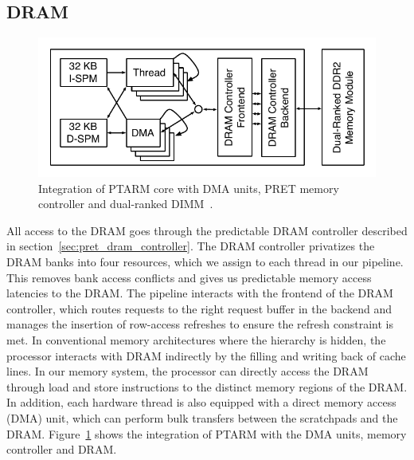 \subsection{DRAM}
\label{sec:ptarm_dram_integration}
\begin{figure}
  \vspace{-20pt}
  \begin{center}
  	\includegraphics[scale=.6]{figs/pret-integration}
  \end{center}
    \vspace{-20pt}
  \caption{\small{Integration of PTARM core with DMA units, PRET memory controller and dual-ranked DIMM~\cite{ReinekeLiuPatelKimLee11_PRETDRAMControllerBankPrivatizationForPredictability}.}}
\label{fig:pretintegration}
  \vspace{-10pt}
\end{figure}
All access to the DRAM goes through the predictable DRAM controller described in section~\ref{sec:pret_dram_controller}.
The DRAM controller privatizes the DRAM banks into four resources, which we assign to each thread in our pipeline. 
This removes bank access conflicts and gives us predictable memory access latencies to the DRAM.
The pipeline interacts with the frontend of the DRAM controller, which routes requests to the right request buffer in the backend and manages the insertion of row-access refreshes to ensure the refresh constraint is met.   
In conventional memory architectures where the hierarchy is hidden, the processor interacts with DRAM indirectly by the filling and writing back of cache lines.
In our memory system, the processor can directly access the DRAM through load and store instructions to the distinct memory regions of the DRAM.
In addition, each hardware thread is also equipped with a direct memory access (DMA) unit, which can perform bulk transfers between the scratchpads and the DRAM.
Figure~\ref{fig:pretintegration} shows the integration of PTARM with the DMA units, memory controller and DRAM.  

